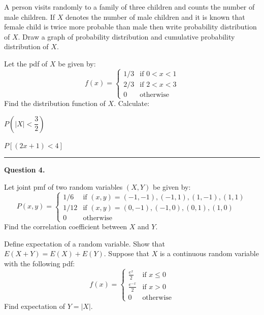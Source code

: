 \documentclass[11pt,a4paper]{article}
\begin{document}
\begin{parts}
  \item A person visits randomly to a family of three children and counts the number of male children. If $X$ denotes the number of male children and it is known that female child is twice more probable than male then write probability distribution of $X$. Draw a graph of probability distribution and cumulative probability distribution of $X$.

  \item Let the pdf of $X$ be given by:
  \[ f(x) = 
\begin{cases} 1/3 &  \text{if } 0 < x < 1 \\ 2/3 &  \text{if } 2 < x < 3 \\ 0 &  \text{otherwise} \end{cases} \]
  Find the distribution function of $X$. Calculate:
  
\begin{parts}
    \item $P\left(|X| < \dfrac{3}{2}\right)$
    \item $P[(2x + 1) < 4]$
  \end{parts}
\end{parts}

\medskip\rule{\linewidth}{0.2pt}\medskip




\noindent   \textbf{Question 4.}

\begin{parts}
  \item Let joint pmf of two random variables $(X, Y)$ be given by:
  \[ P(x, y) = 
\begin{cases} 1/6 &  \text{if } (x,y) = (-1,-1), (-1,1), (1,-1), (1,1) \\ 1/12 &  \text{if } (x,y) = (0,-1), (-1,0), (0,1), (1,0) \\ 0 &  \text{otherwise} \end{cases} \]
  Find the correlation coefficient between $X$ and $Y$.

  \item Define expectation of a random variable. Show that $E(X + Y) = E(X) + E(Y)$. Suppose that $X$ is a continuous random variable with the following pdf:
  \[ f(x) = 
\begin{cases} \frac{e^x}{2} &  \text{if } x \le 0 \\ \frac{e^{-x}}{2} &  \text{if } x > 0 \\ 0 &  \text{otherwise} \end{cases} \]
  Find expectation of $Y = |X|$.
\end{parts}
\end{document}
